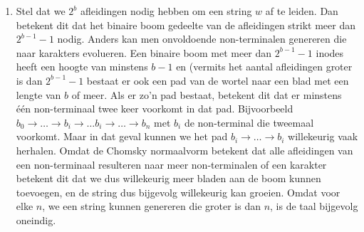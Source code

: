 \documentclass[a4paper]{article}
\newtheorem{lemma}{Lemma}
\begin{document}
\begin{question}
\begin{answer}
\begin{enumerate}
\begin{lemma}
 \end{lemma}
 \item Stel dat we $2^b$ afleidingen nodig hebben om een string $w$ af te leiden. Dan betekent dit dat het binaire boom gedeelte van de afleidingen strikt meer dan $2^{b-1}-1$ nodig. Anders kan men onvoldoende non-terminalen genereren die naar karakters evolueren. Een binaire boom met meer dan $2^{b-1}-1$ inodes heeft een hoogte van minstens $b-1$ en (vermits het aantal afleidingen groter is dan $2^{b-1}-1$ bestaat er ook een pad van de wortel naar een blad met een lengte van $b$ of meer. Als er zo'n pad bestaat, betekent dit dat er minstens \'e\'en non-terminaal twee keer voorkomt in dat pad. Bijvoorbeeld $b_0\rightarrow\ldots\rightarrow b_i\rightarrow\ldots b_i\rightarrow\ldots\rightarrow b_n$ met $b_i$ de non-terminal die tweemaal voorkomt. Maar in dat geval kunnen we het pad $b_i\rightarrow\ldots\rightarrow b_i$ willekeurig vaak herhalen. Omdat de Chomsky normaalvorm betekent dat alle afleidingen van een non-terminaal resulteren naar meer non-terminalen of een karakter betekent dit dat we dus willekeurig meer bladen aan de boom kunnen toevoegen, en de string dus bijgevolg willekeurig kan groeien. Omdat voor elke $n$, we een string kunnen genereren die groter is dan $n$, is de taal bijgevolg oneindig.
\end{enumerate}
\end{answer}
\end{question}
\end{document}
